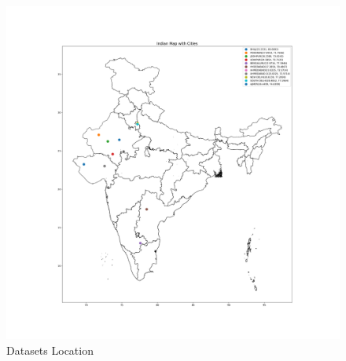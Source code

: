 \documentclass[a4paper,fleqn]{cas-sc}
\begin{document}
\begin{figure}[!ht]
\centering
\includegraphics[width=\textwidth]{AMod India_Map}
\caption{Datasets Location }
\label{fig:Data location}
\end{figure}   
\end{document}
